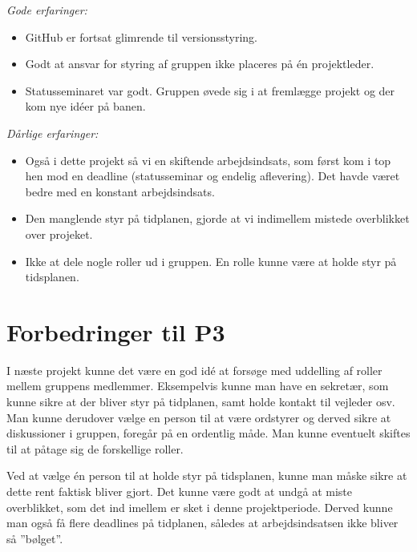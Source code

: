 \emph{Gode erfaringer:}
\begin {itemize}
\item  GitHub er fortsat glimrende til versionsstyring.

\item	Godt at ansvar for styring af gruppen ikke placeres på én projektleder. 

\item	Statusseminaret var godt. Gruppen øvede sig i at fremlægge projekt og der kom nye idéer på banen.
\end{itemize}\emph{Dårlige erfaringer:}
\begin{itemize}
\item	Også i dette projekt så vi en skiftende arbejdsindsats, som først kom i top hen mod en deadline (statusseminar og endelig aflevering). Det havde været bedre med en konstant arbejdsindsats. 

\item	Den manglende styr på tidplanen, gjorde at vi indimellem mistede overblikket over projeket. 

\item	Ikke at dele nogle roller ud i gruppen. En rolle kunne være at holde styr på tidsplanen.
\end{itemize}

\section{Forbedringer til P3}

I næste projekt kunne det være en god idé at forsøge med uddelling af roller mellem gruppens medlemmer. Eksempelvis kunne man have en sekretær, som kunne sikre at der bliver styr på tidplanen, samt holde kontakt til vejleder osv. Man kunne derudover vælge en person til at være ordstyrer og derved sikre at diskussioner i gruppen, foregår på en ordentlig måde. Man kunne eventuelt skiftes til at påtage sig de forskellige roller. 

Ved at vælge én person til at holde styr på tidsplanen, kunne man måske sikre at dette rent faktisk bliver gjort. Det kunne være godt at undgå at miste overblikket, som det ind imellem er sket i denne projektperiode. Derved kunne man også få flere deadlines på tidplanen, således at arbejdsindsatsen ikke bliver så ”bølget”.

